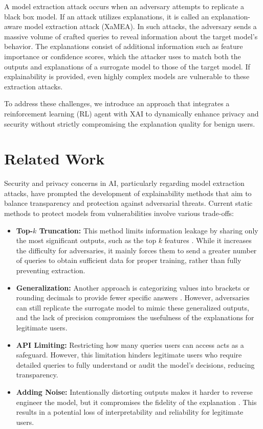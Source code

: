\documentclass[conference]{IEEEtran}
\begin{document}
A model extraction attack occurs when an adversary attempts to replicate a black box model. If an attack utilizes explanations, it is called an explanation-aware model extraction attack (XaMEA). In such attacks, the adversary sends a massive volume of crafted queries to reveal information about the target model's behavior. The explanations consist of additional information such as feature importance or confidence scores, which the attacker uses to match both the outputs and explanations of a surrogate model to those of the target model. If explainability is provided, even highly complex models are vulnerable to these extraction attacks.

To address these challenges, we introduce an approach that integrates a reinforcement learning (RL) agent with XAI to dynamically enhance privacy and security without strictly compromising the explanation quality for benign users.

\section{Related Work}
Security and privacy concerns in AI, particularly regarding model extraction attacks, have prompted the development of explainability methods that aim to balance transparency and protection against adversarial threats. Current static methods to protect models from vulnerabilities involve various trade-offs:

\begin{itemize}
    \item \textbf{Top-$k$ Truncation:} This method limits information leakage by sharing only the most significant outputs, such as the top $k$ features \cite{b2}. While it increases the difficulty for adversaries, it mainly forces them to send a greater number of queries to obtain sufficient data for proper training, rather than fully preventing extraction.
    \item \textbf{Generalization:} Another approach is categorizing values into brackets or rounding decimals to provide fewer specific answers \cite{b3}. However, adversaries can still replicate the surrogate model to mimic these generalized outputs, and the lack of precision compromises the usefulness of the explanations for legitimate users.
    \item \textbf{API Limiting:} Restricting how many queries users can access acts as a safeguard. However, this limitation hinders legitimate users who require detailed queries to fully understand or audit the model's decisions, reducing transparency.
    \item \textbf{Adding Noise:} Intentionally distorting outputs makes it harder to reverse engineer the model, but it compromises the fidelity of the explanation \cite{b4}. This results in a potential loss of interpretability and reliability for legitimate users.
\end{itemize}
\end{document}
